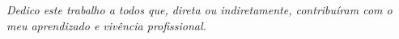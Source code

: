 \documentclass[12pt,openany,oneside,a4paper,english,brazil]{abntbibufjf}
\begin{document}
\begin{frontmatter}


\inserecapa

\inserefolhaderosto


\inserecatalog


\begin{folhadeaprovacao}

  \begin{center}
    {\chapterfont \bfseries \insereautor}

    \vfill
    \begin{center}
      {\chapterfont\bfseries\inseretitulo \inseresubtitulo}
    \end{center}
    \vfill

    \hspace{.45\textwidth}
    \begin{minipage}{.5\textwidth}
        \inserenatureza
    \end{minipage}%
    \vfill
   \end{center}




 \begin{dedicatoria} \vspace*{\fill} \centering \noindent
   \textit{ Dedico este trabalho a todos que, direta ou indiretamente, contribuíram com o meu aprendizado e vivência profissional.}
   \vspace*{\fill}
 \end{dedicatoria}




\end{folhadeaprovacao}
\end{frontmatter}
\end{document}
